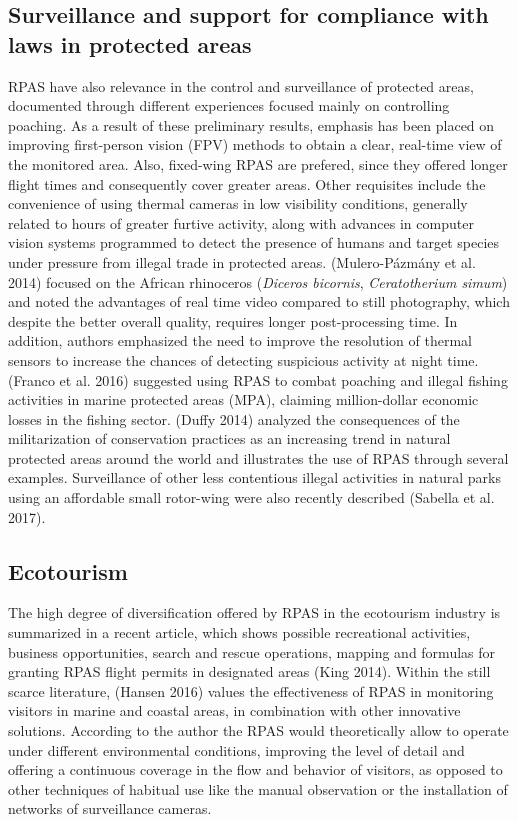 \documentclass[]{interact}
\theoremstyle{plain}%
\theoremstyle{definition}
\theoremstyle{remark}
\begin{document}
\subsection{Surveillance and support for compliance with laws in
protected
areas}\label{surveillance-and-support-for-compliance-with-laws-in-protected-areas}

RPAS have also relevance in the control and surveillance of protected
areas, documented through different experiences focused mainly on
controlling poaching. As a result of these preliminary results, emphasis
has been placed on improving first-person vision (FPV) methods to obtain
a clear, real-time view of the monitored area. Also, fixed-wing RPAS are
prefered, since they offered longer flight times and consequently cover
greater areas. Other requisites include the convenience of using thermal
cameras in low visibility conditions, generally related to hours of
greater furtive activity, along with advances in computer vision systems
programmed to detect the presence of humans and target species under
pressure from illegal trade in protected areas. (Mulero-Pázmány et al.
2014) focused on the African rhinoceros (\emph{Diceros bicornis},
\emph{Ceratotherium simum}) and noted the advantages of real time video
compared to still photography, which despite the better overall quality,
requires longer post-processing time. In addition, authors emphasized
the need to improve the resolution of thermal sensors to increase the
chances of detecting suspicious activity at night time. (Franco et al.
2016) suggested using RPAS to combat poaching and illegal fishing
activities in marine protected areas (MPA), claiming million-dollar
economic losses in the fishing sector. (Duffy 2014) analyzed the
consequences of the militarization of conservation practices as an
increasing trend in natural protected areas around the world and
illustrates the use of RPAS through several examples. Surveillance of
other less contentious illegal activities in natural parks using an
affordable small rotor-wing were also recently described (Sabella et al.
2017).

\subsection{Ecotourism}\label{ecotourism}

The high degree of diversification offered by RPAS in the ecotourism
industry is summarized in a recent article, which shows possible
recreational activities, business opportunities, search and rescue
operations, mapping and formulas for granting RPAS flight permits in
designated areas (King 2014). Within the still scarce literature,
(Hansen 2016) values the effectiveness of RPAS in monitoring visitors in
marine and coastal areas, in combination with other innovative
solutions. According to the author the RPAS would theoretically allow to
operate under different environmental conditions, improving the level of
detail and offering a continuous coverage in the flow and behavior of
visitors, as opposed to other techniques of habitual use like the manual
observation or the installation of networks of surveillance cameras.
\end{document}
